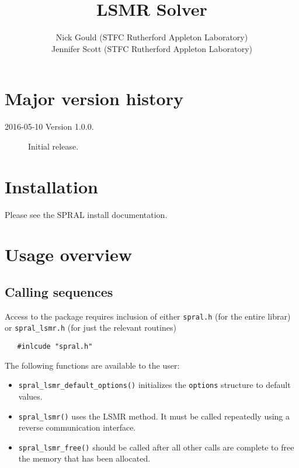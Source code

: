 \title{LSMR Solver}
\author{
   Nick Gould (STFC Rutherford Appleton Laboratory) \\
   Jennifer Scott (STFC Rutherford Appleton Laboratory)
}
\spralmaketitle
\thispagestyle{firststyle}

\newpage
\section*{Major version history}
\begin{description}
\item[2016-05-10 Version 1.0.0.] Initial release.
\end{description}


\section{Installation}
Please see the SPRAL install documentation. 


\section{Usage overview}

\subsection{Calling sequences}

Access to the package requires inclusion of either \texttt{spral.h} (for the
entire \spral librar) or \texttt{spral\_lsmr.h} (for just the relevant routines)

\begin{verbatim}
   #inlcude "spral.h"
\end{verbatim}

\medskip

\noindent
The following functions are available to the user:
\begin{itemize}
\item {\tt spral\_lsmr\_default\_options()} initializes the \texttt{options}
   structure to default values.
\item {\tt spral\_lsmr()} uses the LSMR method. It must be called repeatedly
   using a reverse communication interface.
\item {\tt spral\_lsmr\_free()} should be called after all other calls are
   complete to free the memory that has been allocated. 
\end{itemize}



